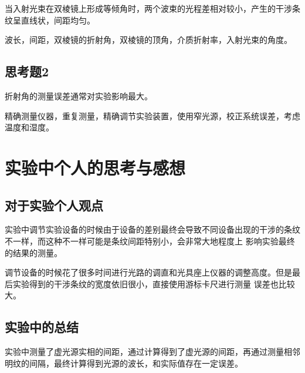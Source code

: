 \documentclass{ctexart}
\begin{document}
  当入射光束在双棱镜上形成等倾角时，两个波束的光程差相对较小，产生的干涉条纹呈直线状，间距均匀。

  波长，间距，双棱镜的折射角，双棱镜的顶角，介质折射率，入射光束的角度。
  \subsection{思考题2} 
  折射角的测量误差通常对实验影响最大。

  精确测量仪器，重复测量，精确调节实验装置，使用窄光源，校正系统误差，考虑温度和湿度。
\newpage

\section{实验中个人的思考与感想}
  \subsection{对于实验个人观点}
  实验中调节实验设备的时候由于设备的差别最终会导致不同设备出现的干涉的条纹不一样，而这种不一样可能是条纹间距特别小，会非常大地程度上
  影响实验最终的结果的测量。

  调节设备的时候花了很多时间进行光路的调直和光具座上仪器的调整高度。但是最后实验得到的干涉条纹的宽度依旧很小，直接使用游标卡尺进行测量
  误差也比较大。

  \subsection{实验中的总结}
  实验中测量了虚光源实相的间距，通过计算得到了虚光源的间距，再通过测量相邻明纹的间隔，最终计算得到光源的波长，和实际值存在一定误差。
\end{document}

